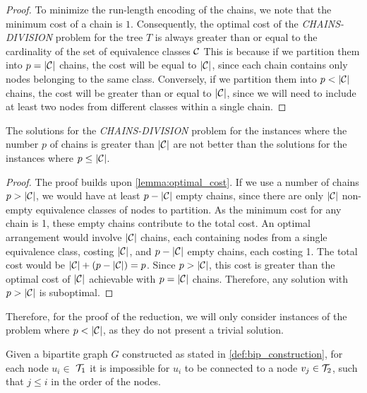 \begin{proof}
    To minimize the run-length encoding of the chains, we note that the minimum cost of a chain is $1$. Consequently, the optimal cost of the \textit{CHAINS-DIVISION} problem for the tree $T$ is always greater than or equal to the cardinality of the set of equivalence classes $\mathcal{C}$ This is because if we partition them into $p = |\mathcal{C}|$ chains, the cost will be equal to $|\mathcal{C}|$, since each chain contains only nodes belonging to the same class. Conversely, if we partition them into $p < |\mathcal{C}|$ chains, the cost will be greater than or equal to $|\mathcal{C}|$, since we will need to include at least two nodes from different classes within a single chain.
\end{proof}

\begin{claim} \label{claim:p_less_than_E}
    The solutions for the \textit{CHAINS-DIVISION} problem for the instances where the number $p$ of chains is greater than $|\mathcal{C}|$ are not better than the solutions for the instances where $p \leq |\mathcal{C}|$.
\end{claim}

\begin{proof}
    The proof builds upon \cref{lemma:optimal_cost}. If we use a number of chains $p > |\mathcal{C}|$, we would have at least $p - |\mathcal{C}|$ empty chains, since there are only $|\mathcal{C}|$ non-empty equivalence classes of nodes to partition. As the minimum cost for any chain is 1, these empty chains contribute to the total cost. An optimal arrangement would involve $|\mathcal{C}|$ chains, each containing nodes from a single equivalence class, costing $|\mathcal{C}|$, and $p - |\mathcal{C}|$ empty chains, each costing 1. The total cost would be $|\mathcal{C}| + (p - |\mathcal{C}|) = p$. Since $p > |\mathcal{C}|$, this cost is greater than the optimal cost of $|\mathcal{C}|$ achievable with $p = |\mathcal{C}|$ chains. Therefore, any solution with $p > |\mathcal{C}|$ is suboptimal.
\end{proof}

Therefore, for the proof of the reduction, we will only consider instances of the problem where $p < |\mathcal{C}|$, as they do not present a trivial solution.

\begin{lemma} \label{lemma:greater_nodes}
    Given a bipartite graph $G$ constructed as stated in \cref{def:bip_construction}, for each node $u_i \in$ $\mathcal{T}_{1}$ it is impossible for $u_i$ to be connected to a node $v_j \in \mathcal{T}_{2}$, such that $j \leq i$ in the order of the nodes.
\end{lemma}

